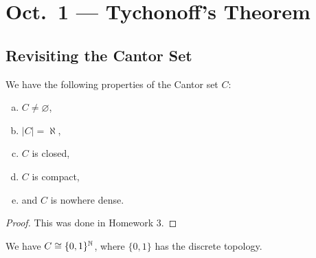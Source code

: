 \chapter{Oct.~1 --- Tychonoff's Theorem}

\section{Revisiting the Cantor Set}

\begin{prop}
  We have the following properties of the Cantor set $C$:
  \begin{enumerate}[(a)]
    \item $C \ne \varnothing$,
    \item $|C| = \aleph$,
    \item $C$ is closed,
    \item $C$ is compact,
    \item and $C$ is nowhere dense.
  \end{enumerate}
\end{prop}

\begin{proof}
  This was done in Homework 3.
\end{proof}

\begin{prop}
  We have $C \cong \{0, 1\}^{\mathbb{N}}$, where $\{0, 1\}$ has
  the discrete topology.
\end{prop}

